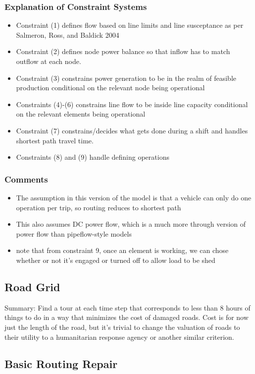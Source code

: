 \documentclass{article}
\begin{document}
	\subsubsection{Explanation of Constraint Systems}
	\begin{itemize}
		\item Constraint (1) defines flow based on line limits and line susceptance as per Salmeron, Ross, and Baldick 2004
		\item Constraint (2) defines node power balance so that inflow has to match outflow at each node.
		\item Constraint (3) constrains power generation to be in the realm of feasible production conditional on the relevant node being operational
		\item Constraints (4)-(6) constrains line flow to be inside line capacity conditional on the relevant elements being operational
		\item Constraint (7) constrains/decides what gets done during a shift and handles shortest path travel time.
		\item Constraints (8) and (9) handle defining operations
	\end{itemize}
	\subsubsection{Comments}
	\begin{itemize}
		\item The assumption in this version of the model is that a vehicle can only do one operation per trip, so routing reduces to shortest path
		\item This also assumes DC power flow, which is a much more through version of power flow than pipeflow-style models
		\item note that from constraint 9, once an element is working, we can chose whether or not it's engaged or turned off to allow load to be shed
	\end{itemize}
	\subsection{Road Grid}
	Summary: Find a tour at each time step that corresponds to less than 8 hours of things to do in a way that minimizes the cost of damaged roads. Cost is for now just the length of the road, but it's trivial to change the valuation of roads to their utility to a humanitarian response agency or another similar criterion.
	\subsection{Basic Routing Repair}
\end{document}
